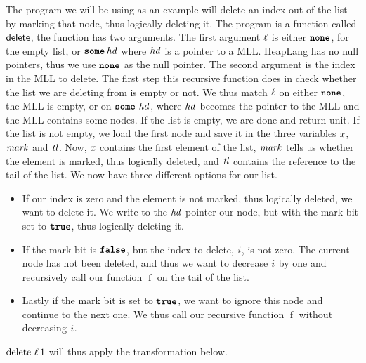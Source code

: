 \documentclass[thesis.tex]{subfiles}
\begin{document}
The program we will be using as an example will delete an index out of the list by marking that node, thus logically deleting it.
\MLLDeleteProg
The program is a function called $\textsf{\upshape delete}$, the function has two arguments. The first argument $\ell$ is either $\operatorname{\texttt{\bfseries none}}$, for the empty list, or $\operatorname{\texttt{\bfseries some}} \mathit{hd}$ where $\mathit{hd}$ is a pointer to a MLL. HeapLang has no null pointers, thus we use $\operatorname{\texttt{\bfseries none}}$ as the null pointer. The second argument is the index in the MLL to delete. The first step this recursive function does in check whether the list we are deleting from is empty or not. We thus match $\ell$ on either $\operatorname{\texttt{\bfseries none}}$, the MLL is empty, or on $\operatorname{\texttt{\bfseries some}}\,\mathit{hd}$, where $\mathit{hd}$ becomes the pointer to the MLL and the MLL contains some nodes. If the list is empty, we are done and return unit. If the list is not empty, we load the first node and save it in the three variables $\mathit{x}$, $\mathit{mark}$ and $\mathit{tl}$. Now, $\mathit{x}$ contains the first element of the list, $\mathit{mark}$ tells us whether the element is marked, thus logically deleted, and $\mathit{tl}$ contains the reference to the tail of the list. We now have three different options for our list.
\begin{itemize}
  \item If our index is zero and the element is not marked, thus logically deleted, we want to delete it. We write to the $\mathit{hd}$ pointer our node, but with the mark bit set to $\texttt{\bfseries true}$, thus logically deleting it.
  \item If the mark bit is $\texttt{\bfseries false}$, but the index to delete, $i$, is not zero. The current node has not been deleted, and thus we want to decrease $i$ by one and recursively call our function $\operatorname{f}$ on the tail of the list.
  \item Lastly if the mark bit is set to $\texttt{\bfseries true}$, we want to ignore this node and continue to the next one. We thus call our recursive function $\operatorname{f}$ without decreasing $i$.
\end{itemize}
$\operatorname{delete}\, \ell\, 1$ will thus apply the transformation below.
\end{document}

